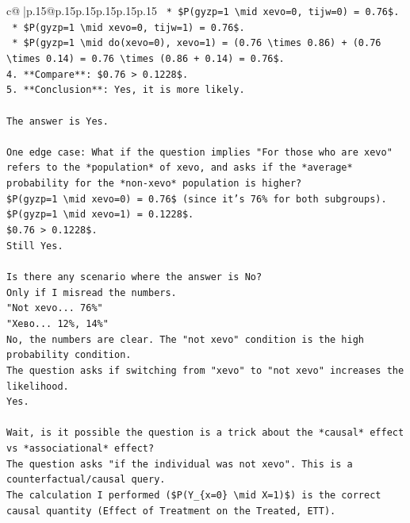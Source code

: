 \documentclass{article}
\begin{document}
{\begin{supertabular}{c@{$\;$}|p{.15\linewidth}@{}p{.15\linewidth}p{.15\linewidth}p{.15\linewidth}p{.15\linewidth}p{.15\linewidth}}
{{{\texttt{    *   \$P(gyzp=1 \textbackslash{}mid xevo=0, tijw=0) = 0.76\$.} \\
\texttt{    *   \$P(gyzp=1 \textbackslash{}mid xevo=0, tijw=1) = 0.76\$.} \\
\texttt{    *   \$P(gyzp=1 \textbackslash{}mid do(xevo=0), xevo=1) = (0.76 \textbackslash{}times 0.86) + (0.76 \textbackslash{}times 0.14) = 0.76 \textbackslash{}times (0.86 + 0.14) = 0.76\$.} \\
\texttt{4.  **Compare**: \$0.76 > 0.1228\$.} \\
\texttt{5.  **Conclusion**: Yes, it is more likely.} \\
\\ 
\texttt{The answer is Yes.} \\
\\ 
\texttt{One edge case: What if the question implies "For those who are xevo" refers to the *population* of xevo, and asks if the *average* probability for the *non{-}xevo* population is higher?} \\
\texttt{\$P(gyzp=1 \textbackslash{}mid xevo=0) = 0.76\$ (since it's 76\% for both subgroups).} \\
\texttt{\$P(gyzp=1 \textbackslash{}mid xevo=1) = 0.1228\$.} \\
\texttt{\$0.76 > 0.1228\$.} \\
\texttt{Still Yes.} \\
\\ 
\texttt{Is there any scenario where the answer is No?} \\
\texttt{Only if I misread the numbers.} \\
\texttt{"Not xevo... 76\%"} \\
\texttt{"Xeво... 12\%, 14\%"} \\
\texttt{No, the numbers are clear. The "not xevo" condition is the high probability condition.} \\
\texttt{The question asks if switching from "xevo" to "not xevo" increases the likelihood.} \\
\texttt{Yes.} \\
\\ 
\texttt{Wait, is it possible the question is a trick about the *causal* effect vs *associational* effect?} \\
\texttt{The question asks "if the individual was not xevo". This is a counterfactual/causal query.} \\
\texttt{The calculation I performed (\$P(Y\_\{x=0\} \textbackslash{}mid X=1)\$) is the correct causal quantity (Effect of Treatment on the Treated, ETT).} \\
}}}
\end{supertabular}}
\end{document}
